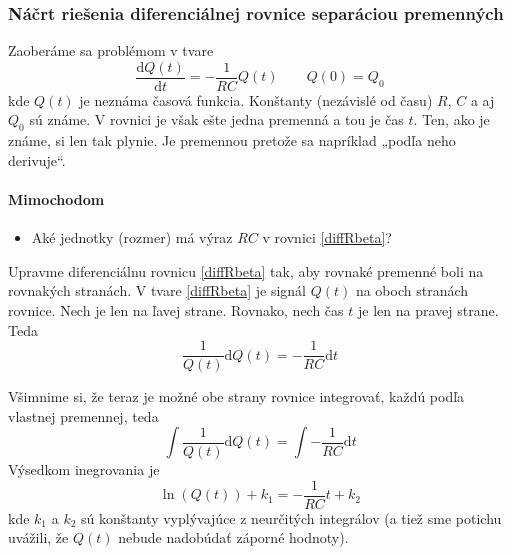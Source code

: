 \documentclass[a4paper, 10pt, ]{article}
\begin{document}
\subsubsection{Náčrt riešenia diferenciálnej rovnice separáciou premenných}

Zaoberáme sa problémom v tvare
\begin{equation} \label{diffRbeta}
    \frac{\text{d}Q(t)}{\text{d}t} = - \frac{1}{RC} Q(t) \qquad Q(0) = Q_0
\end{equation}
kde $Q(t)$ je neznáma časová funkcia. Konštanty (nezávislé od času) $R$, $C$ a aj $Q_0$ sú známe. V rovnici je však ešte jedna premenná a tou je čas $t$. Ten, ako je známe, si len tak plynie. Je premennou pretože sa napríklad „podľa neho derivuje“.



\noindent
\hrulefill

\paragraph{Mimochodom}
\begin{itemize}
    \item Aké jednotky (rozmer) má výraz $RC$ v rovnici \eqref{diffRbeta}?
\end{itemize}
\noindent
\hrulefill

\medskip

Upravme diferenciálnu rovnicu \eqref{diffRbeta} tak, aby rovnaké premenné boli na rovnakých stranách. V tvare \eqref{diffRbeta} je signál $Q(t)$ na oboch stranách rovnice. Nech je len na ľavej strane. Rovnako, nech čas $t$ je len na pravej strane. Teda
\begin{equation} \label{diffRbeta2}
    \frac{1}{Q(t)}\text{d}Q(t) = - \frac{1}{RC} \text{d}t
\end{equation}

Všimnime si, že teraz je možné obe strany rovnice integrovať, každú podľa vlastnej premennej, teda
\begin{equation} \label{diffRbeta3}
    \int \frac{1}{Q(t)}\text{d}Q(t) =  \int - \frac{1}{RC} \text{d}t
\end{equation}
Výsedkom inegrovania je
\begin{equation} \label{diffRbeta4}
     \ln \left(  Q(t)  \right) + k_1 =   - \frac{1}{RC} t + k_2
\end{equation}
kde $k_1$ a $k_2$ sú konštanty vyplývajúce z neurčitých integrálov (a tiež sme potichu uvážili, že $Q(t)$ nebude nadobúdať záporné hodnoty).
\end{document}
